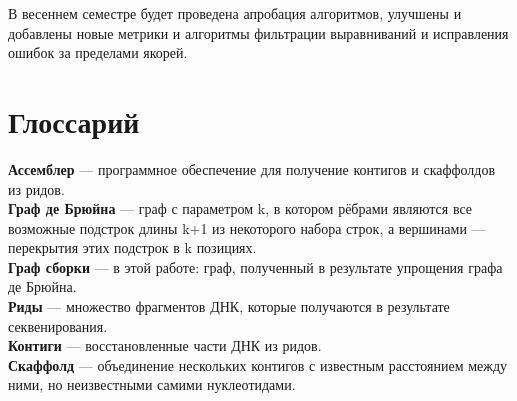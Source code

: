 \documentclass[14pt]{matmex-diploma-custom}
\begin{document}
В весеннем семестре будет проведена апробация алгоритмов, улучшены и добавлены новые метрики и алгоритмы фильтрации выравниваний и исправления ошибок за пределами якорей.


\section*{Глоссарий}

\textbf{Ассемблер} --- программное обеспечение для получение контигов и скаффолдов из ридов.\\

\textbf{Граф де Брюйна} --- граф с параметром k, в котором рёбрами являются все возможные подстрок длины k+1 из некоторого набора строк, а вершинами --- перекрытия этих подстрок в k позициях.\\

\textbf{Граф сборки} --- в этой работе: граф, полученный в результате упрощения графа де Брюйна.\\





\textbf{Риды} --- множество фрагментов ДНК, которые получаются в результате секвенирования.\\

\textbf{Контиги} --- восстановленные части ДНК из ридов.\\

\textbf{Скаффолд} --- объединение нескольких контигов с известным расстоянием между ними, но неизвестными самими нуклеотидами.\\


\setmonofont[Mapping=tex-text]{CMU Typewriter Text}


\end{document}
